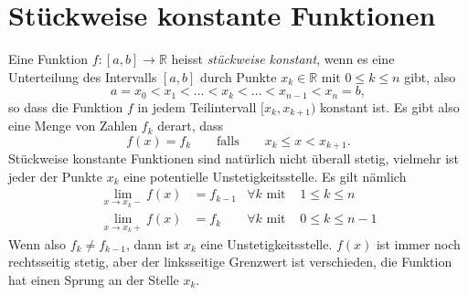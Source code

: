 %
%
%
\section{Stückweise konstante Funktionen%
\label{section:stueckweise}}
Eine Funktion $f\colon[a,b]\to\mathbb R$ heisst {\em stückweise konstant},
wenn es eine Unterteilung des Intervalls $[a,b]$ durch Punkte
%
$x_k\in\mathbb R$ mit $0\le k\le n$ gibt, also
\[
a=x_0 < x_1 < \dots < x_k < \dots < x_{n-1} < x_n = b,
\]
so dass die Funktion $f$ in jedem Teilintervall $[x_k,x_{k+1})$
konstant ist.
Es gibt also eine Menge von Zahlen $f_k$ derart, dass
\begin{equation}
f(x)
=
f_k
\qquad\text{falls}\qquad
x_k \le x < x_{k+1}.
\label{buch:stückweisef}
\end{equation}
Stückweise konstante Funktionen sind natürlich nicht überall stetig,
vielmehr ist jeder der Punkte $x_k$ eine potentielle Unstetigkeitsstelle.
Es gilt nämlich
\begin{equation*}
\begin{aligned}
\lim_{x\to x_k-} f(x)
&=
f_{k-1}&\forall k\text{ mit }&1\le k \le n
\\
\lim_{x\to x_k+} f(x)
&=
f_k&\forall k\text{ mit }&0\le k \le n-1
\end{aligned}
\end{equation*}
Wenn also $f_k\ne f_{k-1}$, dann ist $x_k$ eine Unstetigkeitsstelle.
$f(x)$ ist immer noch rechtsseitig stetig, aber der linksseitige
Grenzwert ist verschieden, die Funktion hat einen Sprung an der
Stelle $x_k$.

